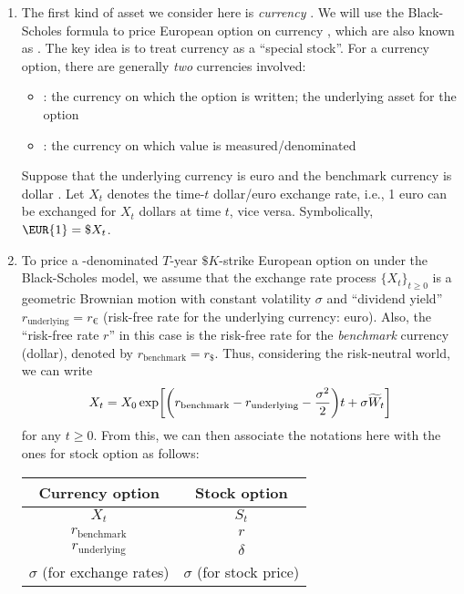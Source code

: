 \begin{enumerate}
\item The first kind of asset we consider here is \emph{currency}
. We will use the Black-Scholes formula to price European
option on currency , which are also known as .  The key idea is to treat currency as a ``special stock''. For a
currency option, there are generally \emph{two} currencies involved:
\begin{itemize}
\item {}: the currency on which the
option is written; the underlying asset for the option
\item {}: the currency on which value is
measured/denominated
\end{itemize}
Suppose that the underlying currency is euro  and the
benchmark currency is dollar . Let \(X_t\) denotes the
time-\(t\) dollar/euro exchange rate, i.e., 1 euro can be exchanged for \(X_t\)
dollars at time \(t\), vice versa. Symbolically, \(\EUR{1}=\$ X_t\).

\item To price a -denominated \(T\)-year \(\$K\)-strike European
option on  under the Black-Scholes model, we assume that the exchange
rate process \(\{X_t\}_{t\ge 0}\) is a geometric Brownian motion with constant
volatility \(\sigma\) and ``dividend yield''
\(r_{\mathrm{underlying}}=r_{\euro}\) (risk-free rate for the underlying
currency: euro). Also, the ``risk-free rate \(r\)'' in this case is the
risk-free rate for the \emph{benchmark} currency (dollar), denoted by
\(r_{\mathrm{benchmark}}=r_{\$}\). Thus, considering the risk-neutral world, we
can write
\[
X_t=X_0\exp[\qty(r_{\mathrm{benchmark}}-r_{\mathrm{underlying}}-\frac{\sigma^2}{2})t+\sigma\widetilde{W}_t]
\]
for any \(t\ge 0\). From this, we can then associate the notations here with
the ones for stock option as follows:
\begin{center}
\begin{tabular}{cc}
\toprule
Currency option&Stock option\\
\midrule
\(X_t\)&\(S_t\)\\
\(r_{\mathrm{benchmark}}\)&\(r\)\\
\(r_{\mathrm{underlying}}\)&\(\delta\)\\
\(\sigma\) (for exchange rates) &\(\sigma\) (for stock price)\\
\bottomrule
\end{tabular}
\end{center}


\end{enumerate}
